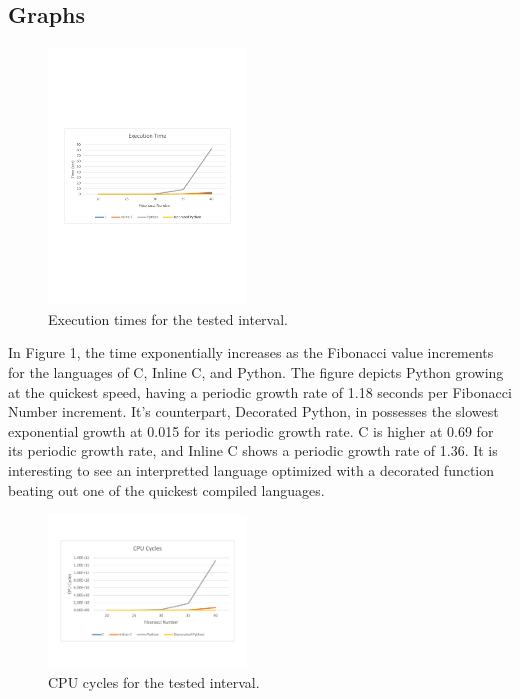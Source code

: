 \documentclass{sig-alternate}
\begin{document}
\subsection{Graphs}

\begin{figure}[h!]
	\centering
		\includegraphics[width=0.47\textwidth] {ExeTime.pdf}
	\caption{Execution times for the tested interval.}
	\label{Exe Times}
\end{figure}

In Figure 1, the time exponentially increases as the Fibonacci value increments for the languages of C, Inline C, and Python. The figure depicts Python growing at the quickest speed, having a periodic growth rate of 1.18 seconds per Fibonacci Number increment. It's counterpart, Decorated Python, in possesses the slowest exponential growth at 0.015 for its periodic growth rate. C is higher at 0.69 for its periodic growth rate, and Inline C shows a periodic growth rate of 1.36. It is interesting to see an interpretted language optimized with a decorated function beating out one of the quickest compiled languages.

\begin{figure}[ht]
	\centering
		\includegraphics[width=0.47\textwidth] {CPUcycles.pdf}
	\caption{CPU cycles for the tested interval.}
	\label{CPU Cycles}
\end{figure}
\end{document}

